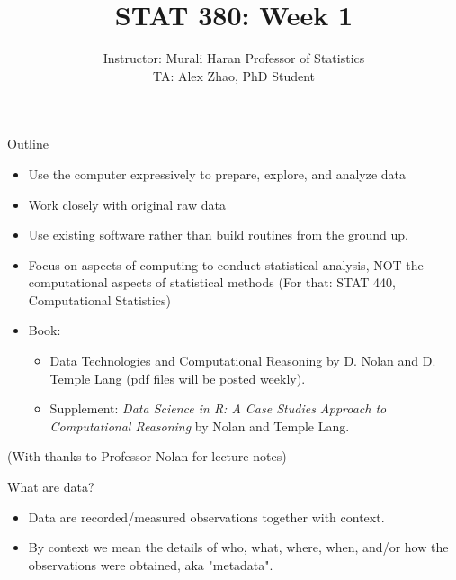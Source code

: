 \documentclass{beamer}\usepackage[]{graphicx}\usepackage[]{color}
\theoremstyle{mystyle}
\begin{document}

\title{
STAT 380: Week 1
}
\author{Instructor: Murali Haran Professor of Statistics\\ TA: Alex Zhao, PhD Student
}
\date{}

\begin{frame}
\titlepage
\end{frame}


\begin{frame}{Outline}
\begin{itemize}
\item Use the computer expressively to prepare, explore, and analyze data
\item Work closely with original raw data 
\item Use existing software rather than build routines from the ground up.
\item Focus on aspects of computing to conduct statistical analysis, NOT the computational aspects of statistical methods (For that: STAT 440, Computational Statistics)
\item Book: 
  \begin{itemize}
  \item Data Technologies and Computational Reasoning by D. Nolan and D. Temple Lang (pdf files will be posted weekly).
  \item Supplement: {\it Data Science in R: A Case Studies Approach to Computational Reasoning} by Nolan and Temple Lang.
  \end{itemize}
\end{itemize}
(With thanks to Professor Nolan for lecture notes)
\end{frame}

\begin{frame}{What are data?}
\begin{itemize}
\item Data are recorded/measured observations together with context. 

\item By context we mean the details of who, what, where, when, and/or how the observations were obtained, aka "metadata".
\end{itemize}

\end{frame}
\end{document}

